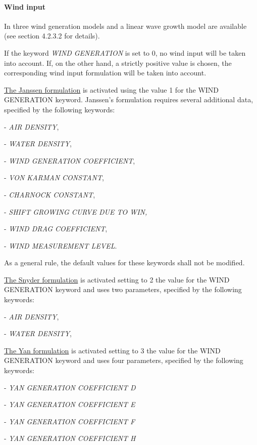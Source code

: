 \paragraph{ Wind input}

 In \tomawac three wind generation models and a linear wave growth model are available (see section 4.2.3.2 for details).

 If the keyword \textit{WIND GENERATION} is set to 0, no wind input will be taken into account. If, on the other hand, a strictly
 positive value is chosen, the corresponding wind input formulation will be taken into account.

 \underline{ The Janssen formulation} is activated using the value 1 for the WIND GENERATION keyword. Janssen's formulation requires
 several additional data, specified by the following keywords:
 
- \textit{AIR DENSITY},

- \textit{WATER DENSITY},  

- \textit{WIND GENERATION COEFFICIENT}, 

- \textit{VON KARMAN CONSTANT}, 

- \textit{CHARNOCK CONSTANT},   

- \textit{SHIFT GROWING CURVE DUE TO WIN,} 

- \textit{WIND DRAG COEFFICIENT},  

- \textit{WIND MEASUREMENT LEVEL}.  

  \textit{}

As a general rule, the default values for these keywords shall not be modified.

\underline{ The Snyder formulation} is activated setting to 2 the value for the WIND GENERATION keyword and uses two parameters,
specified by the following keywords:   

- \textit{AIR DENSITY},   

- \textit{WATER DENSITY},

   \textit{}

   \underline{ The Yan formulation} is activated setting to 3 the value for the WIND GENERATION keyword and uses four parameters,
   specified by the following keywords:   

- \textit{YAN GENERATION COEFFICIENT D}  

- \textit{YAN GENERATION COEFFICIENT E} 

- \textit{YAN GENERATION COEFFICIENT F} 

- \textit{YAN GENERATION COEFFICIENT H}

